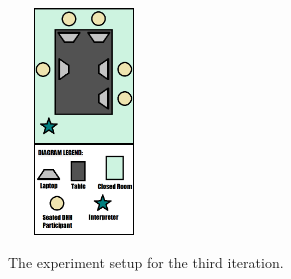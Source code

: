 \documentclass{sigchi-ext}
\begin{document}
\begin{marginfigure}[0.5pc]
\begin{minipage}{\marginparwidth}
     \includegraphics[width=4cm,height=6cm]{figures/iter3SetupVector.png}
    \caption{The experiment setup for the third iteration.}
    \label{fig:iter3SetupVector}
    \end{minipage}
\end{marginfigure}
\end{document}
